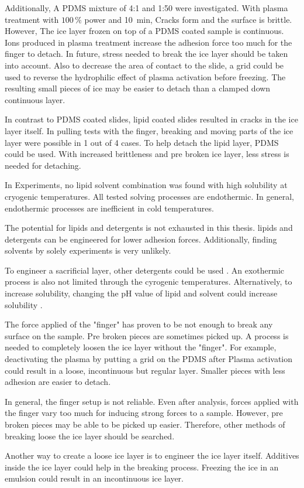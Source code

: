 Additionally, A PDMS mixture of 4:1 and 1:50 were investigated. With plasma treatment with $100\,\%$ power and \SI{10}{\minute}, Cracks form and the surface is brittle. However, The ice layer frozen on top of a PDMS coated sample is continuous. Ions produced in plasma treatment increase the adhesion force too much for the finger to detach. In future, stress needed to break the ice layer should be taken into account. Also to decrease the area of contact to the slide, a grid could be used to reverse the hydrophilic effect of plasma activation before freezing. The resulting small pieces of ice may be easier to detach than a clamped down continuous layer.

In contrast to PDMS coated slides, lipid coated slides resulted in cracks in the ice layer itself. In pulling tests with the finger, breaking and moving parts of the ice layer were possible in 1 out of 4 cases. To help detach the lipid layer, PDMS could be used. With increased brittleness and pre broken ice layer, less stress is needed for detaching.

In Experiments, no lipid solvent combination was found with high solubility at cryogenic temperatures. All tested solving processes are endothermic. In general, endothermic processes are inefficient in cold temperatures.

The potential for lipids and detergents is not exhausted in this thesis. lipids and detergents can be engineered for lower adhesion forces. Additionally, finding solvents by solely experiments is very unlikely. 

To engineer a sacrificial layer, other detergents could be used \cite{SigmaAldrich.2023}. An exothermic process is also not limited through the cyrogenic temperatures. Alternatively, to increase solubility, changing the pH value of lipid and solvent could increase solubility \cite{BruceA.AverillPatriciaEldredge.}.

The force applied of the "finger" has proven to be not enough to break any surface on the sample. Pre broken pieces are sometimes picked up. A process is needed to completely loosen the ice layer without the "finger". For example, deactivating the plasma by putting a grid on the PDMS after Plasma activation could result in a loose, incontinuous but regular layer. Smaller pieces with less adhesion are easier to detach.

In general, the finger setup is not reliable. Even after analysis, forces applied with the finger vary too much for inducing strong forces to a sample. However, pre broken pieces may be able to be picked up easier. Therefore, other methods of breaking loose the ice layer should be searched.

Another way to create a loose ice layer is to engineer the ice layer itself. Additives inside the ice layer could help in the breaking process. Freezing the ice in an emulsion could result in an incontinuous ice layer. 

